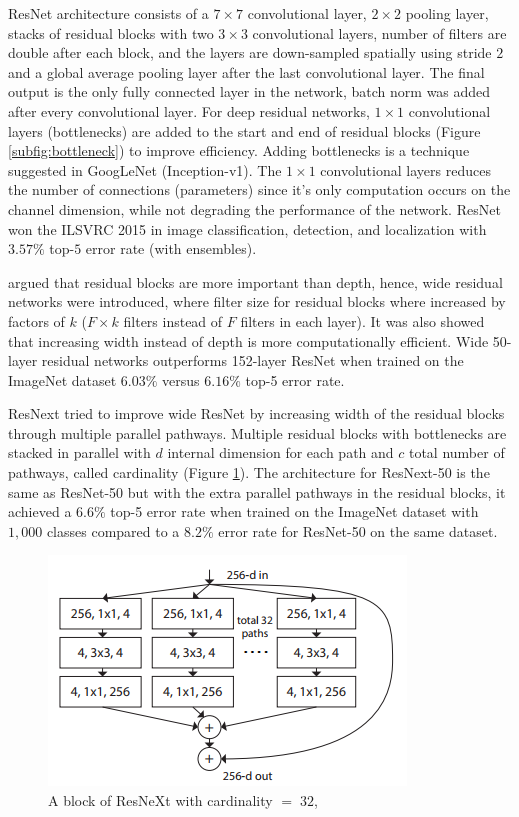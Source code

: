 \documentclass[12pt]{report}
\numberwithin{equation}{section}
\begin{document}
ResNet architecture consists of a $7 \times 7$ convolutional layer, $2 \times 2$ pooling layer, stacks of residual blocks with two $3 \times 3$ convolutional layers, number of filters are double after each block, and the layers are down-sampled spatially using stride $2$ and a global average pooling layer after the last convolutional layer. The final output is the only fully connected layer in the network, batch norm was added after every convolutional layer. For deep residual networks, $1 \times 1$ convolutional layers (bottlenecks) are added to the start and end of residual blocks (Figure \ref{subfig:bottleneck}) to improve efficiency. Adding bottlenecks is a technique suggested in  GoogLeNet {\cite{szegedy2015going}} (Inception-v1). The $1 \times 1$ convolutional layers reduces the number of connections (parameters) since it's only computation occurs on the channel dimension, while not degrading the performance of the network. ResNet won the ILSVRC 2015 in image classification, detection, and localization with $3.57\%$ top-$5$ error rate (with ensembles).

{\cite{zagoruyko2017wide}} argued that residual blocks are more important than depth, hence, wide residual networks were introduced, where filter size for residual blocks where increased by factors of $k$ ($F \times k$ filters instead of $F$ filters in each layer). It was also showed that increasing width instead of depth is more computationally efficient. Wide 50-layer residual networks outperforms 152-layer ResNet when trained on the ImageNet dataset $6.03\%$ versus $6.16\%$ top-5 error rate. 

ResNext {\cite{Xie}} tried to improve wide ResNet by increasing width of the residual blocks through multiple parallel pathways. Multiple residual blocks with bottlenecks are stacked in parallel with $d$ internal dimension for each path and $c$ total number of pathways, called cardinality (Figure \ref{fig:resnext}). The architecture for ResNext-50 is the same as ResNet-50 but with the extra parallel pathways in the residual blocks, it achieved a $6.6\%$ top-5 error rate when trained on the ImageNet dataset with $1,000$ classes compared to a $8.2\%$ error rate for ResNet-50 on the same dataset.
\begin{figure}[H]
\centering
\includegraphics[scale=1.1]{png/resnext.png}
\caption[A block of ResNeXt with cardinality = 32]{A block of ResNeXt with cardinality $= \;32$, }	
\label{fig:resnext}
\end{figure} 
\end{document}
